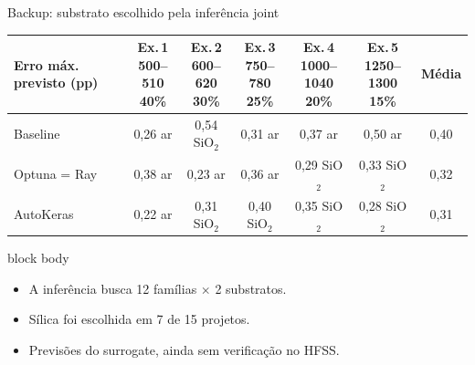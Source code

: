 \documentclass[aspectratio=169,11pt]{beamer}
\newcommand{\resumo}[1]{\begin{beamercolorbox}[rounded=true,sep=.5ex]{block body}\small\begin{itemize}\setlength\itemsep{0pt}#1\end{itemize}\end{beamercolorbox}}
\begin{document}
\begin{frame}{Backup: substrato escolhido pela inferência joint}
  {\centering\scriptsize\setlength{\tabcolsep}{3pt}
  \begin{tabular}{lcccccc}
    \toprule
    Erro máx. previsto (pp) & \shortstack{Ex.\,1\\500--510\\40\%} & \shortstack{Ex.\,2\\600--620\\30\%} & \shortstack{Ex.\,3\\750--780\\25\%} & \shortstack{Ex.\,4\\1000--1040\\20\%} & \shortstack{Ex.\,5\\1250--1300\\15\%} & Média\\
    \midrule
    Baseline&0,26 ar&0,54 SiO$_2$&0,31 ar&0,37 ar&0,50 ar&0,40\\
    Optuna = Ray&0,38 ar&0,23 ar&0,36 ar&0,29 SiO$_2$&0,33 SiO$_2$&0,32\\
    AutoKeras&0,22 ar&0,31 SiO$_2$&0,40 SiO$_2$&0,35 SiO$_2$&0,28 SiO$_2$&0,31\\
    \bottomrule
  \end{tabular}\par}
  \vspace{2ex}
  \resumo{
    \item A inferência busca 12 famílias $\times$ 2 substratos.
    \item Sílica foi escolhida em 7 de 15 projetos.
    \item Previsões do surrogate, ainda sem verificação no HFSS.}
\end{frame}
\end{document}
